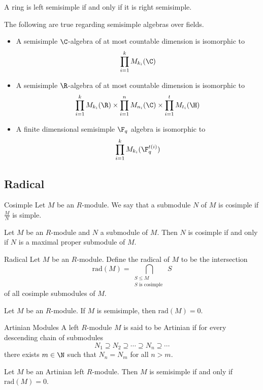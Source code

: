 \documentclass[a4paper]{article}
\begin{document}
\begin{crl}{}{} A ring is left semisimple if and only if it is right semisimple. 
\end{crl}

\begin{prp}{}{} The following are true regarding semisimple algebras over fields. 
\begin{itemize}
\item A semisimple $\C$-algebra of at most countable dimension is isomorphic to $$\prod_{i=1}^kM_{k_i}(\C)$$
\item A semisimple $\R$-algebra of at most countable dimension is isomorphic to $$\prod_{i=1}^kM_{k_i}(\R)\times\prod_{i=1}^nM_{n_i}(\C)\times\prod_{i=1}^tM_{t_i}(\H)$$
\item A finite dimensional semisimple $\F_q$ algebra is isomorphic to $$\prod_{i=1}^k M_{k_i}(\F_q^{t(i)})$$
\end{itemize}
\end{prp}

\subsection{Radical}
\begin{defn}{Cosimple}{} Let $M$ be an $R$-module. We say that a submodule $N$ of $M$ is cosimple if $\frac{M}{N}$ is simple. 
\end{defn}

\begin{lmm}{}{} Let $M$ be an $R$-module and $N$ a submodule of $M$. Then $N$ is cosimple if and only if $N$ is a maximal proper submodule of $M$. 
\end{lmm}

\begin{defn}{Radical}{} Let $M$ be an $R$-module. Define the radical of $M$ to be the intersection $$\text{rad}(M)=\bigcap_{\substack{S\leq M\\S\text{ is cosimple }}}S$$ of all cosimple submodules of $M$. 
\end{defn}

\begin{lmm}{}{} Let $M$ be an $R$-module. If $M$ is semisimple, then $\text{rad}(M)=0$. 
\end{lmm}

\begin{defn}{Artinian Modules}{} A left $R$-module $M$ is said to be Artinian if for every descending chain of submodules $$N_1\supseteq N_2\supseteq\cdots\supseteq N_n\supseteq\cdots$$ there exists $m\in\N$ such that $N_n=N_m$ for all $n>m$. 
\end{defn}

\begin{thm}{}{} Let $M$ be an Artinian left $R$-module. Then $M$ is semisimple if and only if $\text{rad}(M)=0$. 
\end{thm}
\end{document}
